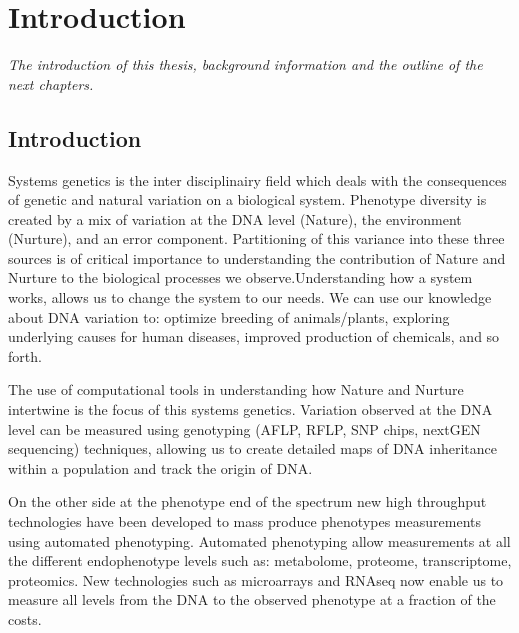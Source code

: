 \chapter{Introduction}
\emph{The introduction of this thesis, background information and the outline of the next chapters.}

\null
\vfill
\newpage

\section{Introduction}
Systems genetics is the inter disciplinairy field which deals with the consequences of genetic 
and natural variation on a biological system. Phenotype diversity is created by a mix of variation 
at the DNA level (Nature), the environment (Nurture), and an error component. Partitioning of this 
variance into these three sources is of critical importance to understanding the contribution of 
Nature and Nurture to the biological processes we observe.Understanding how a system works, allows 
us to change the system to our needs. We can use our knowledge about DNA variation to: optimize 
breeding of animals/plants, exploring underlying causes for human diseases, improved production 
of chemicals, and so forth.

The use of computational tools in understanding how Nature and Nurture intertwine is the 
focus of this systems genetics. Variation observed at the DNA level can be measured using 
genotyping (AFLP, RFLP, SNP chips, nextGEN sequencing) techniques, allowing us to create 
detailed maps of DNA inheritance within a population and track the origin of DNA. 

On the other side at the phenotype end of the spectrum new high throughput technologies 
have been developed to mass produce phenotypes measurements using automated phenotyping. 
Automated phenotyping allow measurements at all the different endophenotype levels such 
as: metabolome, proteome, transcriptome, proteomics. New technologies such as microarrays 
and RNAseq now enable us to measure all levels from the DNA to the observed phenotype at 
a fraction of the costs.


